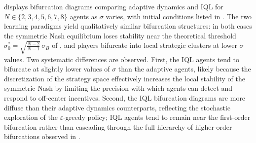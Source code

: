 \documentclass{article}
\begin{document}
             displays bifurcation diagrams comparing adaptive dynamics and IQL for $N \in \{2,3,4,5,6,7,8\}$ agents as $\sigma$ varies, with initial conditions listed in . The two learning paradigms yield qualitatively similar bifurcation structures: in both cases the symmetric Nash equilibrium loses stability near the theoretical threshold $\sigma_0^* = \sqrt{\frac{N-2}{N-1}}\,\sigma_B$ of , and players bifurcate into local strategic clusters at lower $\sigma$ values. Two systematic differences are observed. First, the IQL agents tend to bifurcate at slightly lower values of $\sigma$ than the adaptive agents, likely because the discretization of the strategy space effectively increases the local stability of the symmetric Nash by limiting the precision with which agents can detect and respond to off-center incentives. Second, the IQL bifurcation diagrams are more diffuse than their adaptive dynamics counterparts, reflecting the stochastic exploration of the $\varepsilon$-greedy policy; IQL agents tend to remain near the first-order bifurcation rather than cascading through the full hierarchy of higher-order bifurcations observed in .
\end{document}
